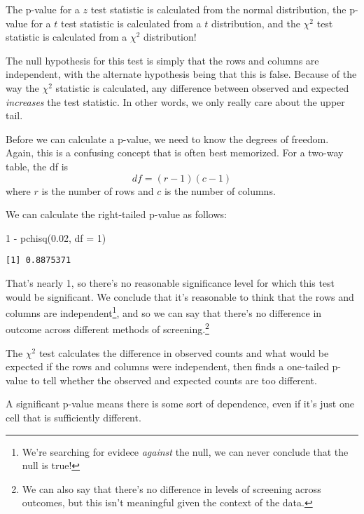 \documentclass[
  letterpaper,
  DIV=11,
  numbers=noendperiod]{scrreprt}
\newenvironment{Shaded}{\begin{snugshade}}{\end{snugshade}}
\newcommand{\AttributeTok}[1]{\textcolor[rgb]{0.40,0.45,0.13}{#1}}
\newcommand{\DecValTok}[1]{\textcolor[rgb]{0.68,0.00,0.00}{#1}}
\newcommand{\FloatTok}[1]{\textcolor[rgb]{0.68,0.00,0.00}{#1}}
\newcommand{\FunctionTok}[1]{\textcolor[rgb]{0.28,0.35,0.67}{#1}}
\newcommand{\NormalTok}[1]{\textcolor[rgb]{0.00,0.23,0.31}{#1}}
\newcommand{\SpecialCharTok}[1]{\textcolor[rgb]{0.37,0.37,0.37}{#1}}
\begin{document}
The p-value for a \(z\) test statistic is calculated from the normal
distribution, the p-value for a \(t\) test statistic is calculated from
a \(t\) distribution, and the \(\chi^2\) test statistic is calculated
from a \(\chi^2\) distribution!

The null hypothesis for this test is simply that the rows and columns
are independent, with the alternate hypothesis being that this is false.
Because of the way the \(\chi^2\) statistic is calculated, any
difference between observed and expected \emph{increases} the test
statistic. In other words, we only really care about the upper tail.

Before we can calculate a p-value, we need to know the degrees of
freedom. Again, this is a confusing concept that is often best
memorized. For a two-way table, the df is \[
df = (r-1)(c-1)
\] where \(r\) is the number of rows and \(c\) is the number of columns.

We can calculate the right-tailed p-value as follows:

\begin{Shaded}
\begin{Highlighting}[]
\DecValTok{1} \SpecialCharTok{{-}} \FunctionTok{pchisq}\NormalTok{(}\FloatTok{0.02}\NormalTok{, }\AttributeTok{df =} \DecValTok{1}\NormalTok{)}
\end{Highlighting}
\end{Shaded}

\begin{verbatim}
[1] 0.8875371
\end{verbatim}

That's nearly 1, so there's no reasonable significance level for which
this test would be significant. We conclude that it's reasonable to
think that the rows and columns are independent\footnote{We're searching
  for evidece \emph{against} the null, we can never conclude that the
  null is true!}, and so we can say that there's no difference in
outcome across different methods of screening.\footnote{We can also say
  that there's no difference in levels of screening across outcomes, but
  this isn't meaningful given the context of the data.}

\begin{tcolorbox}[enhanced jigsaw, toptitle=1mm, colbacktitle=quarto-callout-note-color!10!white, breakable, leftrule=.75mm, left=2mm, opacityback=0, colframe=quarto-callout-note-color-frame, rightrule=.15mm, toprule=.15mm, bottomtitle=1mm, titlerule=0mm, title=\textcolor{quarto-callout-note-color}{\faInfo}\hspace{0.5em}{The \(\chi^2\) Test}, arc=.35mm, colback=white, bottomrule=.15mm, opacitybacktitle=0.6, coltitle=black]

The \(\chi^2\) test calculates the difference in observed counts and
what would be expected if the rows and columns were independent, then
finds a one-tailed p-value to tell whether the observed and expected
counts are too different.

A significant p-value means there is some sort of dependence, even if
it's just one cell that is sufficiently different.

\end{tcolorbox}
\end{document}
